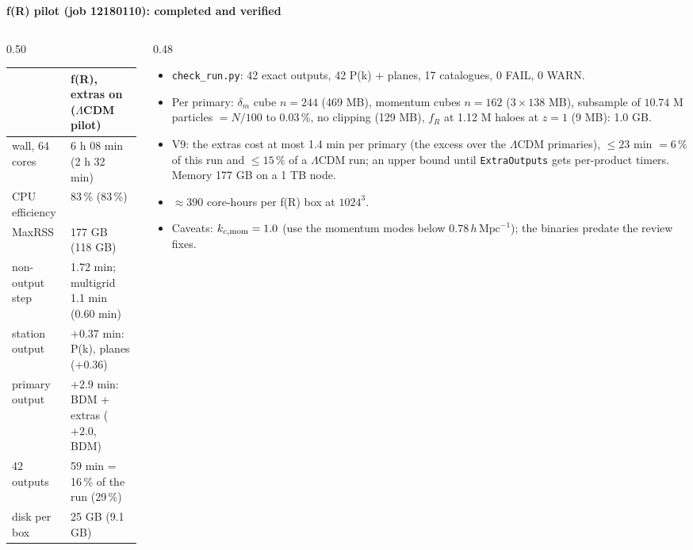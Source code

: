 \documentclass[UTF8]{beamer}
\begin{document}
\begin{frame}{\textbf{f(R) pilot (job 12180110): completed and verified}}
  \begin{columns}[T]
    \begin{column}{0.50\textwidth}
      \scriptsize
      \begin{tabular}{@{}lp{}@{}}
        \toprule
        & f(R), extras on \quad ($\Lambda$CDM pilot) \\
        \midrule
        wall, 64 cores & 6 h 08 min (2 h 32 min) \\
        CPU efficiency & 83\,\% (83\,\%) \\
        MaxRSS & 177 GB (118 GB) \\
        non-output step & 1.72 min; multigrid 1.1 min (0.60 min) \\
        station output & $+0.37$ min: P(k), planes ($+0.36$) \\
        primary output & $+2.9$ min: BDM + extras ($+2.0$, BDM) \\
        42 outputs & 59 min = 16\,\% of the run (29\,\%) \\
        disk per box & 25 GB (9.1 GB) \\
        \bottomrule
      \end{tabular}
    \end{column}
    \begin{column}{0.48\textwidth}
      \footnotesize
      \begin{itemize}
        \item \texttt{check\_run.py}: 42 exact outputs, 42 P(k) + planes, 17 catalogues, 0 FAIL, 0 WARN.
        \item Per primary: $\delta_m$ cube $n = 244$ (469 MB), momentum cubes $n = 162$ ($3\times138$ MB),
          subsample of $10.74$ M particles $= N/100$ to 0.03\,\%, no clipping (129 MB), $f_R$ at 1.12 M haloes
          at $z = 1$ (9 MB): 1.0 GB.
        \item V9: the extras cost at most 1.4 min per primary (the excess over the $\Lambda$CDM primaries),
          $\le 23$ min $= 6\,\%$ of this run and $\le 15\,\%$ of a $\Lambda$CDM run; an upper bound until
          \texttt{ExtraOutputs} gets per-product timers. Memory 177 GB on a 1 TB node.
        \item $\approx 390$ core-hours per f(R) box at $1024^3$.
        \item Caveats: $k_{c,\rm mom} = 1.0$ (use the momentum modes below $0.78\,h\,\mathrm{Mpc}^{-1}$);
          the binaries predate the review fixes.
      \end{itemize}
    \end{column}
  \end{columns}
\end{frame}
\end{document}

